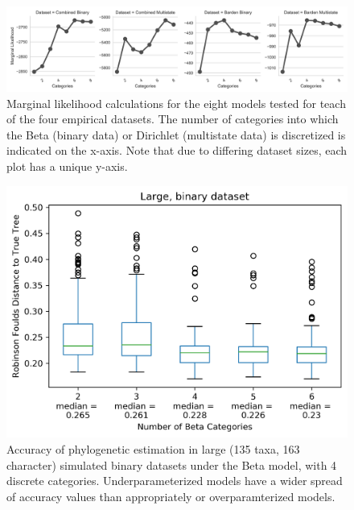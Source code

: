 \documentclass[]{article}
\begin{document}
\begin{figure}
  \caption{Marginal likelihood calculations for the eight models tested for teach of the four empirical datasets. The number of categories into which the Beta (binary data) or Dirichlet (multistate data) is discretized is indicated on the x-axis. Note that due to differing dataset sizes, each plot has a unique y-axis.}
    \includegraphics[scale=0.5]{fig/SS_plot_nostar}
\end{figure} 


\begin{figure}
  \caption{Accuracy of phylogenetic estimation in large (135 taxa, 163 character) simulated binary datasets under the Beta model, with 4 discrete categories. Underparameterized models have a wider spread of accuracy values than appropriately or overparamterized models.} 
    \includegraphics{fig/LargeBinary}
\end{figure} 
\end{document}
